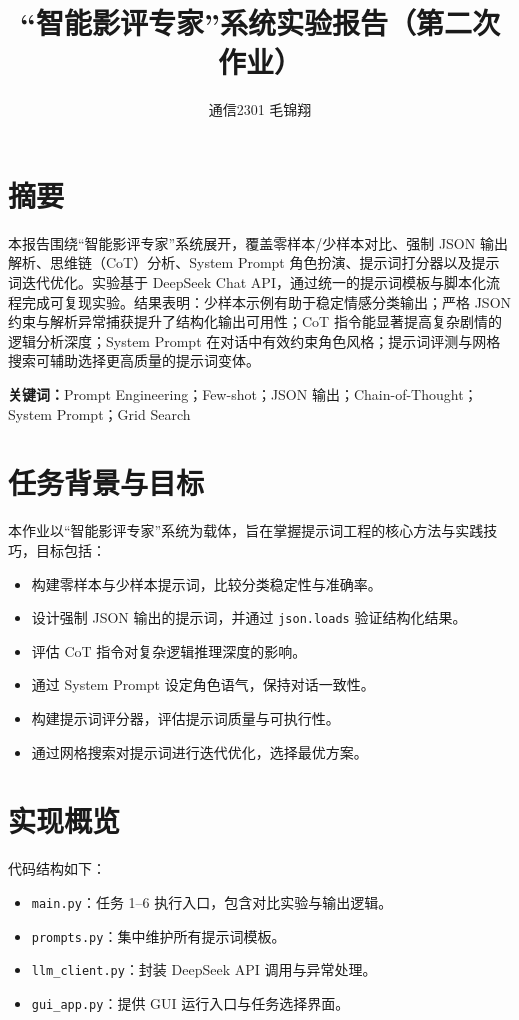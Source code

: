 \documentclass[UTF8, a4paper, 12pt]{ctexart}
\title{“智能影评专家”系统实验报告（第二次作业）}
\author{通信2301 毛锦翔}
\date{}
\begin{document}
\maketitle

\section*{摘要}

本报告围绕“智能影评专家”系统展开，覆盖零样本/少样本对比、强制 JSON 输出解析、思维链（CoT）分析、System Prompt 角色扮演、提示词打分器以及提示词迭代优化。实验基于 DeepSeek Chat API，通过统一的提示词模板与脚本化流程完成可复现实验。结果表明：少样本示例有助于稳定情感分类输出；严格 JSON 约束与解析异常捕获提升了结构化输出可用性；CoT 指令能显著提高复杂剧情的逻辑分析深度；System Prompt 在对话中有效约束角色风格；提示词评测与网格搜索可辅助选择更高质量的提示词变体。

\textbf{关键词：}Prompt Engineering；Few-shot；JSON 输出；Chain-of-Thought；System Prompt；Grid Search

\section{任务背景与目标}

本作业以“智能影评专家”系统为载体，旨在掌握提示词工程的核心方法与实践技巧，目标包括：

\begin{itemize}
  \item 构建零样本与少样本提示词，比较分类稳定性与准确率。
  \item 设计强制 JSON 输出的提示词，并通过 \texttt{json.loads} 验证结构化结果。
  \item 评估 CoT 指令对复杂逻辑推理深度的影响。
  \item 通过 System Prompt 设定角色语气，保持对话一致性。
  \item 构建提示词评分器，评估提示词质量与可执行性。
  \item 通过网格搜索对提示词进行迭代优化，选择最优方案。
\end{itemize}

\section{实现概览}

代码结构如下：
\begin{itemize}
  \item \texttt{main.py}：任务 1--6 执行入口，包含对比实验与输出逻辑。
  \item \texttt{prompts.py}：集中维护所有提示词模板。
  \item \texttt{llm\_client.py}：封装 DeepSeek API 调用与异常处理。
  \item \texttt{gui\_app.py}：提供 GUI 运行入口与任务选择界面。
\end{itemize}
\end{document}
